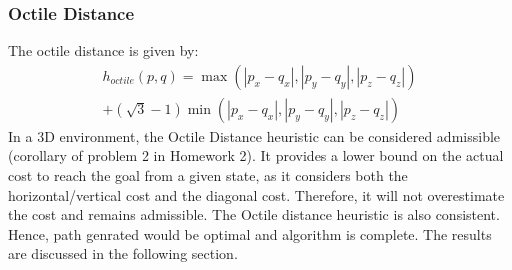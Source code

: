 \documentclass[conference]{IEEEtran}
\begin{document}
\subsubsection{Octile Distance}
The octile distance is given by:
\begin{multline*}
h_{octile}(p, q) = \max(|p_x - q_x|, |p_y - q_y|, |p_z - q_z|) \\
+ (\sqrt{3} - 1) \min(|p_x - q_x|, |p_y - q_y|, |p_z - q_z|)
\end{multline*}
In a 3D environment, the Octile Distance heuristic can be considered admissible (corollary of problem 2 in Homework 2). It provides a lower bound on the actual cost to reach the goal from a given state, as it considers both the horizontal/vertical cost and the diagonal cost. 
Therefore, it will not overestimate the cost and remains admissible. The Octile distance heuristic is also consistent. Hence, path genrated would be optimal and algorithm is complete. The results are discussed in the following section.
\end{document}

